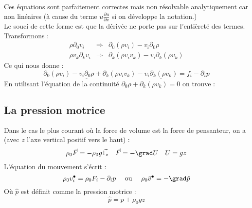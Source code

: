 	Ces équations sont parfaitement correctes mais non résolvable analytiquement 
	car non linéaires (à cause du terme $u\frac{\partial u}{\partial x}$ si on 
	développe la notation.)\\
	
	Le souci de cette forme est que la dérivée ne porte pas sur l'entièreté des 
	termes. Transformons :
	\begin{equation}
	\begin{array}{lll}
	\rho\partial_0 v_i & \Rightarrow&  \partial_0(\rho v_i) - v_i\partial_0\rho\\
	\rho v_k\partial_k v_i &\Rightarrow & \partial_k(\rho v_iv_k)-v_i\partial_k(\rho
	v_k)
	\end{array}
	\end{equation}
	Ce qui nous donne :
	\begin{equation}
	\partial_0(\rho v_i) - \underline{v_i\partial_0\rho}+ \partial_k(\rho v_iv_k)-
	\underline{v_i\partial_k(\rho v_k)} = f_i-\partial_ip
	\end{equation}
	En utilisant l'équation de la continuité $\partial_0\rho + \partial_k(\rho v_k)
	=0$ on trouve :\\
	
	
	\subsection{La pression motrice}	
	Dans le cas le plus courant où la force de volume est la force de pensanteur, on
	a (avec $z$ l'axe vertical positif vers le haut) :
	\begin{equation}
	\begin{array}{ccc}
	\rho_0\vec{F} = -\rho_0g\vec{1_z} & \vec{F} = -\grad U & U = gz
	\end{array}
	\end{equation}
	L'équation du mouvement s'écrit :
	\begin{equation}
	\rho_0v_i^\bullet = \rho_0F_i - \partial_i p\ \ \ \ \text{ou }\ \ \ \rho_0
	\vec{v}^\bullet = -\grad \hat{p}	
	\end{equation}
	Où $\hat{p}$ est définit comme la pression motrice :
	\begin{equation}
	\hat{p} = p+\rho_0 gz
	\end{equation}
	
